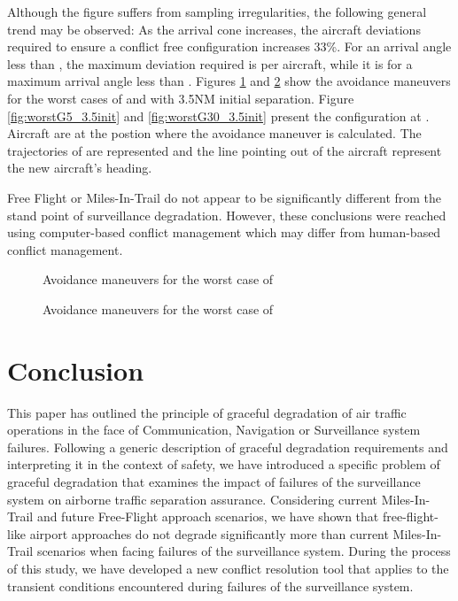 \documentclass[a4paper, 10pt]{IEEEtran}
\begin{document}
Although the figure suffers from sampling irregularities, the following general trend may be observed: As the arrival cone increases, the aircraft deviations required to ensure a conflict free configuration increases 33\%. For an arrival angle less than , the maximum deviation required is   per aircraft, while it is    for a maximum arrival angle less than . 
Figures \ref{fig:worstG5} and \ref{fig:worstG30}  show the avoidance maneuvers for the worst cases of  and   with 3.5NM initial separation. Figure \ref{fig:worstG5_3.5init} and \ref{fig:worstG30_3.5init} present the configuration at . Aircraft are at the postion where the avoidance maneuver is calculated. The trajectories of  are represented and the line pointing out of the aircraft represent the new aircraft's heading.

 Free Flight or Miles-In-Trail do not appear to be significantly different from the stand point of surveillance degradation. However, these conclusions were reached using computer-based conflict management which may differ from human-based conflict management.


 \begin{figure}[ht]
\centering
{}
\caption{Avoidance maneuvers for the worst case of }\label{fig:worstG5}
\end{figure}

 \begin{figure}[ht]
\centering
{}
\caption{Avoidance maneuvers for the worst case of }\label{fig:worstG30}
\end{figure}


 
\section{Conclusion}
This paper has outlined the principle of graceful degradation of air traffic
operations in the face of Communication, Navigation or Surveillance system
failures.
Following a generic description of graceful degradation requirements and
interpreting it in the context of safety, we have introduced a specific
problem
of graceful degradation that examines the impact of failures of the
surveillance system on airborne traffic separation assurance. Considering
current Miles-In-Trail and
future Free-Flight approach scenarios, we have shown that free-flight-like
airport approaches
do not degrade significantly more than current Miles-In-Trail scenarios
when facing failures of the
surveillance system. During the process of this study, we have developed a
new conflict resolution tool that
applies to the transient conditions encountered during failures of the
surveillance system.
\end{document}

